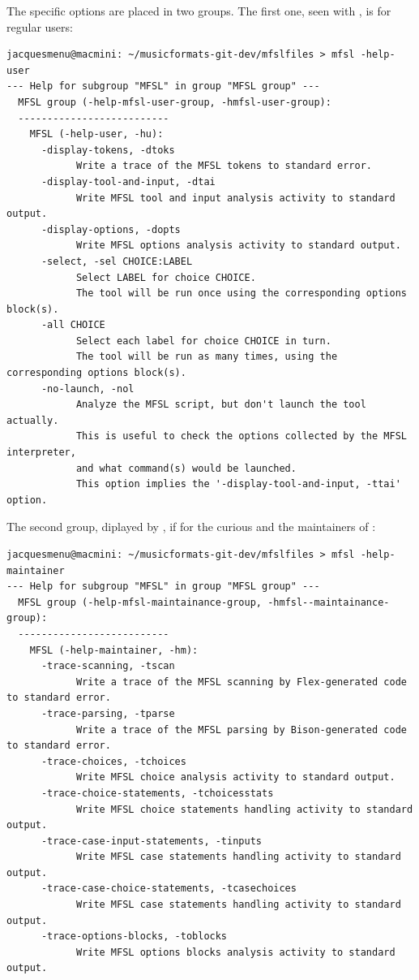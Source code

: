 The specific options are placed in two groups. The first one, seen with , is for regular users:
\begin{lstlisting}[language=Terminal]
jacquesmenu@macmini: ~/musicformats-git-dev/mfslfiles > mfsl -help-user
--- Help for subgroup "MFSL" in group "MFSL group" ---
  MFSL group (-help-mfsl-user-group, -hmfsl-user-group):
  --------------------------
    MFSL (-help-user, -hu):
      -display-tokens, -dtoks
            Write a trace of the MFSL tokens to standard error.
      -display-tool-and-input, -dtai
            Write MFSL tool and input analysis activity to standard output.
      -display-options, -dopts
            Write MFSL options analysis activity to standard output.
      -select, -sel CHOICE:LABEL
            Select LABEL for choice CHOICE.
            The tool will be run once using the corresponding options block(s).
      -all CHOICE
            Select each label for choice CHOICE in turn.
            The tool will be run as many times, using the corresponding options block(s).
      -no-launch, -nol
            Analyze the MFSL script, but don't launch the tool actually.
            This is useful to check the options collected by the MFSL interpreter,
            and what command(s) would be launched.
            This option implies the '-display-tool-and-input, -ttai' option.
\end{lstlisting}

The second group, diplayed by , if for the curious and the maintainers of \mf:
\begin{lstlisting}[language=Terminal]
jacquesmenu@macmini: ~/musicformats-git-dev/mfslfiles > mfsl -help-maintainer
--- Help for subgroup "MFSL" in group "MFSL group" ---
  MFSL group (-help-mfsl-maintainance-group, -hmfsl--maintainance-group):
  --------------------------
    MFSL (-help-maintainer, -hm):
      -trace-scanning, -tscan
            Write a trace of the MFSL scanning by Flex-generated code to standard error.
      -trace-parsing, -tparse
            Write a trace of the MFSL parsing by Bison-generated code to standard error.
      -trace-choices, -tchoices
            Write MFSL choice analysis activity to standard output.
      -trace-choice-statements, -tchoicesstats
            Write MFSL choice statements handling activity to standard output.
      -trace-case-input-statements, -tinputs
            Write MFSL case statements handling activity to standard output.
      -trace-case-choice-statements, -tcasechoices
            Write MFSL case statements handling activity to standard output.
      -trace-options-blocks, -toblocks
            Write MFSL options blocks analysis activity to standard output.
\end{lstlisting}



